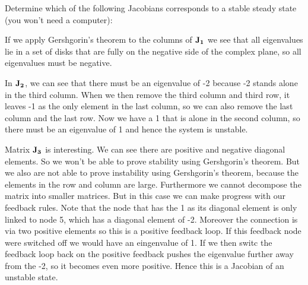 Determine which of the following Jacobians corresponds to a stable steady state (you won't need a computer):


\solution
If we apply Gershgorin's theorem to the columns of $\bf J_1$ we see that all eigenvalues lie in a set of disks that are fully on the negative side of the complex plane, so all eigenvalues must be negative. 


In $\bf J_2$, we can see that there must be an eigenvalue of -2 because -2 stands alone in the third column. When we then remove the third column and third row, it leaves -1 as the only element in the last column, so we can also remove the last column and the last row. Now we have a 1 that is alone in the second column, so there must be an eigenvalue of 1 and hence the system is unstable. 

Matrix $\bf J_3$ is interesting. We can see there are positive and negative diagonal elements. So we won't be able to prove stability using Gershgorin's theorem. But we also are not able to prove instability using Gershgorin's theorem, because the elements in the row and column are large. Furthermore we cannot decompose the matrix into smaller matrices. But in this case we can make progress with our feedback rules. Note that the node that has the 1 as its diagonal element is only linked to node 5, which has a diagonal element of -2. Moreover the connection is via two positive elements so this is a positive feedback loop. If this feedback node were switched off we would have an eingenvalue of 1. If we then switc the feedback loop back on the positive feedback pushes the eigenvalue further away from the -2, so it becomes even more positive. Hence this is a Jacobian of an unstable state.  

